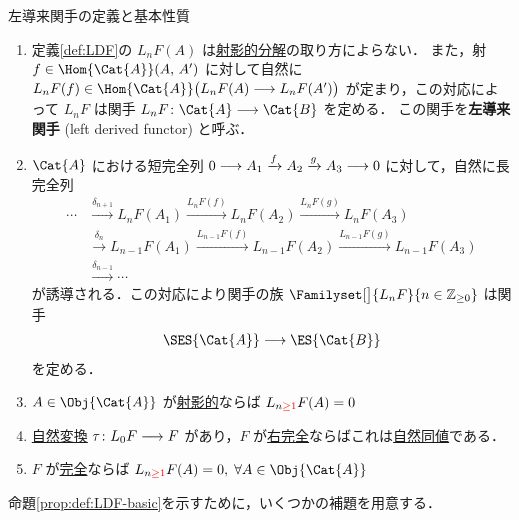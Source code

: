 \documentclass[algtopo_main]{subfiles}
\begin{document}
\begin{myprop}[label=def:LDF-basic, breakable]{左導来関手の定義と基本性質}
    \begin{enumerate}
        \item 定義\ref{def:LDF}の $L_nF(A)$ は\hyperref[def:projective-resolution]{射影的分解}の取り方によらない．
        また，射 $f \in \Hom{\Cat{A}}(A,\, A')$ に対して自然に $L_n F(f) \in \Hom{\Cat{A}}\bigl(L_nF(A) \lto L_nF(A') \bigr)$ が定まり，この対応によって $L_n F$ は関手 $L_n F \colon \Cat{A} \lto \Cat{B}$ を定める．
        この関手を\textbf{左導来関手} (left derived functor) と呼ぶ．
        \item $\Cat{A}$ における短完全列 $0\longrightarrow A_1 \xrightarrow{f} A_2 \xrightarrow{g} A_3 \longrightarrow 0$ に対して，自然に長完全列
        \begin{align}
            \cdots &\xrightarrow{\delta_{n+1}} L_nF(A_1) \xrightarrow{L_nF(f)} L_nF(A_2) \xrightarrow{L_nF(g)} L_nF(A_3) \\
                &\xrightarrow{\delta_{n}} L_{n-1}F(A_1) \xrightarrow{L_{n-1}F(f)} L_{n-1}F(A_2) \xrightarrow{L_{n-1}F(g)} L_{n-1}F(A_3) \\
                &\xrightarrow{\delta_{n-1}} \cdots 
        \end{align}
        が誘導される．この対応により関手の族 $\Familyset[\big]{L_nF}{n \in \mathbb{Z}_{\ge 0}}$ は関手
        \begin{align}
            \SES{\Cat{A}} \lto \ES{\Cat{B}}
        \end{align}
        を定める．
        \item $A \in \Obj{\Cat{A}}$ が\hyperref[def:proj-mod]{射影的}ならば $L_{n \textcolor{red}{\ge 1}}F(A) = 0$
        \item \hyperref[def:nat]{自然変換} $\tau\colon L_0 F \longrightarrow F$ があり，$F$ が\hyperref[def:Ab-func]{右完全}ならばこれは\hyperref[def:naturallyeq]{自然同値}である．
        \item $F$ が\hyperref[def:Ab-func]{完全}ならば $L_{n \textcolor{red}{\ge 1}}F(A) = 0,\; \forall A \in \Obj{\Cat{A}}$
    \end{enumerate}
\end{myprop}

命題\ref{prop:def:LDF-basic}を示すために，いくつかの補題を用意する．
\end{document}
